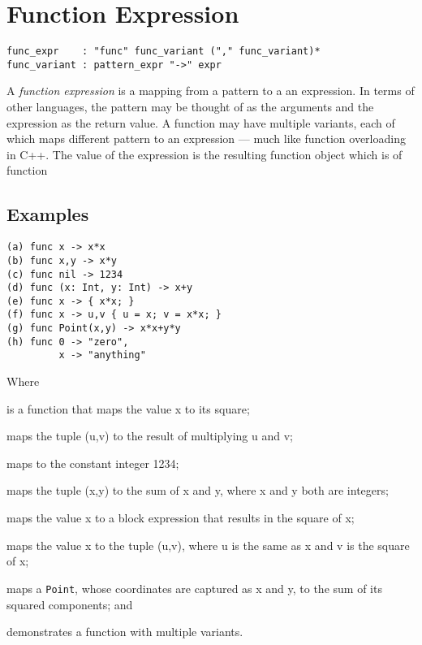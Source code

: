 \section{Function Expression}

\begin{verbatim}
func_expr    : "func" func_variant ("," func_variant)*
func_variant : pattern_expr "->" expr
\end{verbatim}

A \emph{function expression} is a mapping from a pattern to a an expression. In
terms of other languages, the pattern may be thought of as the arguments and the
expression as the return value. A function may have multiple variants, each
of which maps different pattern to an expression --- much like function
overloading in C++. The value of the expression is the resulting function object
which is of function %

\subsection{Examples}

\begin{verbatim}
(a) func x -> x*x
(b) func x,y -> x*y
(c) func nil -> 1234
(d) func (x: Int, y: Int) -> x+y
(e) func x -> { x*x; }
(f) func x -> u,v { u = x; v = x*x; }
(g) func Point(x,y) -> x*x+y*y
(h) func 0 -> "zero",
         x -> "anything"
\end{verbatim}

Where \begin{exdesc}
	\item is a function that maps the value x to its square;
	\item maps the tuple (u,v) to the result of multiplying u and v;
	\item maps to the constant integer 1234;
	\item maps the tuple (x,y) to the sum of x and y, where x and y both are
	      integers;
	\item maps the value x to a block expression that results in the square of
	      x;
	\item maps the value x to the tuple (u,v), where u is the same as x and v is
	      the square of x;
	\item maps a \texttt{Point}, whose coordinates are captured as x and y,
	      to the sum of its squared components; and
	\item demonstrates a function with multiple variants.
\end{exdesc}
